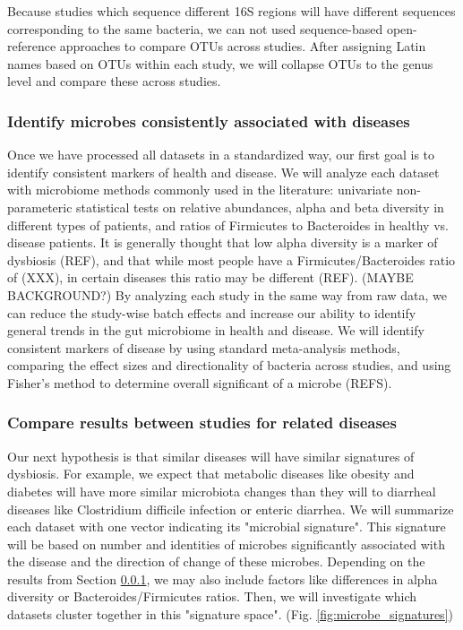 \documentclass[12pt]{article}
\begin{document}
Because studies which sequence different 16S regions will have different sequences corresponding to the same bacteria, we can not used sequence-based open-reference approaches to compare OTUs across studies. After assigning Latin names based on OTUs within each study, we will collapse OTUs to the genus level and compare these across studies.

\subsubsection{Identify microbes consistently associated with diseases}\label{sec:indep_studies}
Once we have processed all datasets in a standardized way, our first goal is to identify consistent markers of health and disease. We will analyze each dataset with microbiome methods commonly used in the literature: univariate non-parameteric statistical tests on relative abundances, alpha and beta diversity in different types of patients, and ratios of Firmicutes to Bacteroides in healthy vs. disease patients. It is generally thought that low alpha diversity is a marker of dysbiosis (REF), and that while most people have a Firmicutes/Bacteroides ratio of (XXX), in certain diseases this ratio may be different (REF). (MAYBE BACKGROUND?) By analyzing each study in the same way from raw data, we can reduce the study-wise batch effects and increase our ability to identify general trends in the gut microbiome in health and disease. We will identify consistent markers of disease by using standard meta-analysis methods, comparing the effect sizes and directionality of bacteria across studies, and using Fisher's method to determine overall significant of a microbe (REFS). 

\subsubsection{Compare results between studies for related diseases}\label{sec:signatures}
Our next hypothesis is that similar diseases will have similar signatures of dysbiosis. For example, we expect that metabolic diseases like obesity and diabetes will have more similar microbiota changes than they will to diarrheal diseases like Clostridium difficile infection or enteric diarrhea. We will summarize each dataset with one vector indicating its "microbial signature". This signature will be based on number and identities of microbes significantly associated with the disease and the direction of change of these microbes. Depending on the results from Section \ref{sec:indep_studies}, we may also include factors like differences in alpha diversity or Bacteroides/Firmicutes ratios. Then, we will investigate which datasets cluster together in this "signature space". (Fig. \ref{fig:microbe_signatures})
\end{document}

